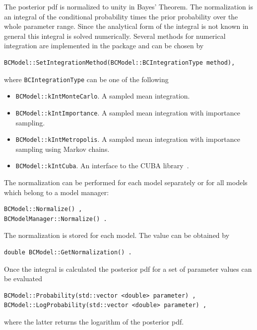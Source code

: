 \documentclass[11pt, a4paper]{article}
\begin{document}
The posterior pdf is normalized to unity in Bayes' Theorem. The
normalization is an integral of the conditional probability times the
prior probability over the whole parameter range. Since the analytical
form of the integral is not known in general this integral is solved
numerically. Several methods for numerical integration are implemented
in the package and can be chosen by
%
\begin{verbatim}
BCModel::SetIntegrationMethod(BCModel::BCIntegrationType method),
\end{verbatim}

\noindent
where \verb|BCIntegrationType| can be one of the following
%
\begin{itemize}
\item \verb|BCModel::kIntMonteCarlo|. A sampled mean integration.
\item \verb|BCModel::kIntImportance|. A sampled mean integration
 with importance sampling.
\item \verb|BCModel::kIntMetropolis|. A sampled mean integration
 with importance sampling using Markov chains.
\item \verb|BCModel::kIntCuba|. An interface to the CUBA
  library~\cite{CUBA,CUBAweb}.
\end{itemize}

\noindent
The normalization can be performed for each model separately or for
all models which belong to a model manager:
%
\begin{verbatim}
BCModel::Normalize() ,
BCModelManager::Normalize() .
\end{verbatim}

\noindent
The normalization is stored for each model. The value can be obtained
by
%
\begin{verbatim}
double BCModel::GetNormalization() .
\end{verbatim}

\noindent
Once the integral is calculated the posterior pdf for a set of
parameter values can be evaluated
%
\begin{verbatim}
BCModel::Probability(std::vector <double> parameter) ,
BCModel::LogProbability(std::vector <double> parameter) ,
\end{verbatim}
%
where the latter returns the logarithm of the posterior pdf.

\end{document}
